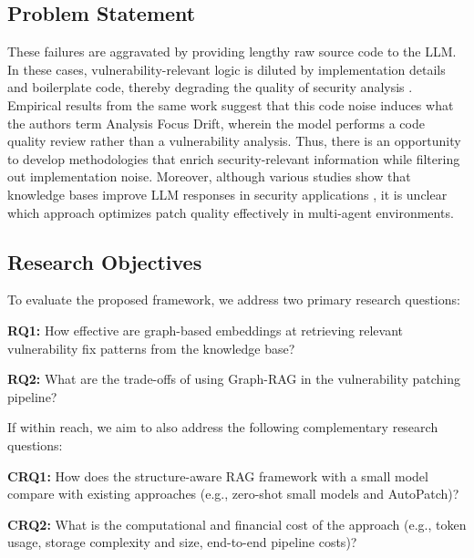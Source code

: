 \documentclass[11pt, a4paper]{article}
\begin{document}
\subsection{Problem Statement}
These failures are aggravated by providing lengthy raw source code to the LLM. 
In these cases, vulnerability-relevant logic is diluted by implementation details and boilerplate code, thereby degrading the quality of security analysis \cite{contextenhancedYang}.
Empirical results from the same work suggest that this code noise induces what the authors term Analysis Focus Drift, wherein the model performs a code quality review rather than a vulnerability analysis.
Thus, there is an opportunity to develop methodologies that enrich security-relevant information while filtering out implementation noise. 
Moreover, although various studies show that knowledge bases improve LLM responses in security applications \cite{du2025vulragenhancingllmbasedvulnerability, seo2026autopatch, wang2025valign, guo2025bluecodeagentblueteamingagent}, it is unclear which approach optimizes patch quality effectively in multi-agent environments.

\subsection{Research Objectives}

To evaluate the proposed framework, we address two primary research questions:
 
\textbf{RQ1: }How effective are graph-based embeddings at retrieving relevant vulnerability fix patterns from the knowledge base?
 
\textbf{RQ2: }What are the trade-offs of using Graph-RAG in the vulnerability patching pipeline?

If within reach, we aim to also address the following complementary research questions:
 
\textbf{CRQ1: }How does the structure-aware RAG framework with a small model compare with existing approaches (e.g., zero-shot small models and AutoPatch)?

\textbf{CRQ2: }What is the computational and financial cost of the approach (e.g., token usage, storage complexity and size, end-to-end pipeline costs)? 
\end{document}
